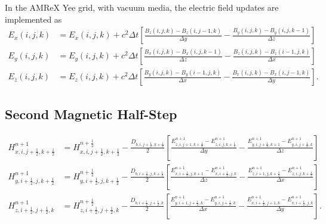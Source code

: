 \documentclass{article}
\numberwithin{equation}{section}
\numberwithin{figure}{section}
\begin{document}
In the AMReX Yee grid, with vacuum media, the electric field updates are implemented as
\begin{subequations}\label{eq:fdtd-e-full-amrex}
    \begin{align}
        E_x(i,j,k) & = E_x(i,j,k) + c^2 \Delta t \left[\frac{B_z(i,j,k)-B_z(i,j-1,k)}{\Delta y} - \frac{B_y(i,j,k)-B_y(i,j,k-1)}{\Delta z}\right]  \\
        E_y(i,j,k) & = E_y(i,j,k) + c^2 \Delta t \left[\frac{B_x(i,j,k)-B_x(i,j,k-1)}{\Delta z} - \frac{B_z(i,j,k)-B_z(i-1,j,k)}{\Delta x}\right]  \\
        E_z(i,j,k) & = E_z(i,j,k) + c^2 \Delta t \left[\frac{B_y(i,j,k)-B_y(i-1,j,k)}{\Delta x} - \frac{B_x(i,j,k)-B_x(i,j-1,k)}{\Delta y}\right].
    \end{align}
\end{subequations}

\subsection{Second Magnetic Half-Step}
\begin{subequations}\label{eq:fdtd-second-h-half}
    \begin{align}
        H_{x,i,j+\frac{1}{2},k+\frac{1}{2}}^{n+1} & = H_{x,i,j+\frac{1}{2},k+\frac{1}{2}}^{n+\frac{1}{2}} - \frac{D_{b,i,j+\frac{1}{2},k+\frac{1}{2}}}{2} \left[\frac{E_{z,i,j+1,k+\frac{1}{2}}^{n+1}-E_{z,i,j,k+\frac{1}{2}}^{n+1}}{\Delta y} - \frac{E_{y,i,j+\frac{1}{2},k+1}^{n+1}-E_{y,i,j+\frac{1}{2},k}^{n+1}}{\Delta z}\right]
        \label{eq:fdtd-second-hx}                                                                                                                                                                                                                                                                                                       \\
        H_{y,i+\frac{1}{2},j,k+\frac{1}{2}}^{n+1} & = H_{y,i+\frac{1}{2},j,k+\frac{1}{2}}^{n+\frac{1}{2}} - \frac{D_{b,i+\frac{1}{2},j,k+\frac{1}{2}}}{2} \left[\frac{E_{x,i+\frac{1}{2},j,k+1}^{n+1}-E_{x,i+\frac{1}{2},j,k}^{n+1}}{\Delta z} - \frac{E_{z,i+1,j,k+\frac{1}{2}}^{n+1}-E_{z,i,j,k+\frac{1}{2}}^{n+1}}{\Delta x}\right]
        \label{eq:fdtd-second-hy}                                                                                                                                                                                                                                                                                                       \\
        H_{z,i+\frac{1}{2},j+\frac{1}{2},k}^{n+1} & = H_{z,i+\frac{1}{2},j+\frac{1}{2},k}^{n+\frac{1}{2}} - \frac{D_{b,i+\frac{1}{2},j+\frac{1}{2},k}}{2} \left[\frac{E_{y,i+1,j+\frac{1}{2},k}^{n+1}-E_{y,i,j+\frac{1}{2},k}^{n+1}}{\Delta x} - \frac{E_{x,i+\frac{1}{2},j+1,k}^{n+1}-E_{x,i+\frac{1}{2},j,k}^{n+1}}{\Delta y}\right].
        \label{eq:fdtd-second-hz}
    \end{align}
\end{subequations}
\end{document}
